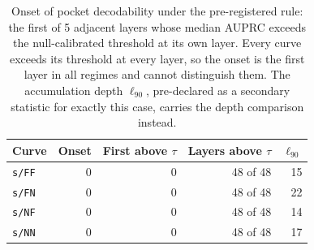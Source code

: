 \begin{table}[t]
\centering
\caption{Onset of pocket decodability under the pre-registered rule: the first of 5 adjacent layers whose median AUPRC exceeds the null-calibrated threshold at its own layer. Every curve exceeds its threshold at every layer, so the onset is the first layer in all regimes and cannot distinguish them. The accumulation depth $\ell_{90}$, pre-declared as a secondary statistic for exactly this case, carries the depth comparison instead.}
\label{tab:onset-observed}
\begin{tabular}{lrrrr}
\toprule
Curve & Onset & First above $\tau$ & Layers above $\tau$ & $\ell_{90}$ \\
\midrule
\texttt{s/FF} & 0 & 0 & 48 of 48 & 15 \\
\texttt{s/FN} & 0 & 0 & 48 of 48 & 22 \\
\texttt{s/NF} & 0 & 0 & 48 of 48 & 14 \\
\texttt{s/NN} & 0 & 0 & 48 of 48 & 17 \\
\bottomrule
\end{tabular}
\end{table}
